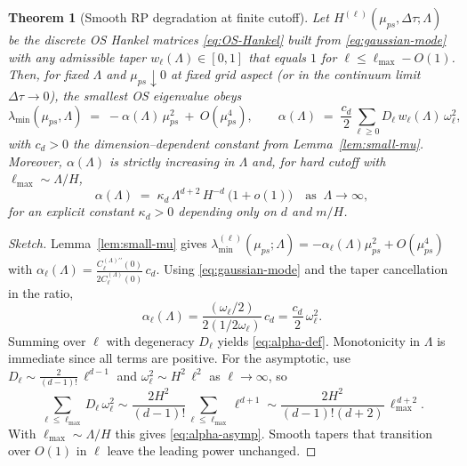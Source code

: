\documentclass[10pt]{article}
\theoremstyle{definition}
\theoremstyle{plain}
\newtheorem{theorem}{Theorem}[section]
\begin{document}
\begin{theorem}[Smooth RP degradation at finite cutoff]\label{thm:smooth-RP}
Let \(H^{(\ell)}(\mu_{ps},\Delta\tau;\Lambda)\) be the discrete OS Hankel matrices \eqref{eq:OS-Hankel} built from \eqref{eq:gaussian-mode} with any admissible taper \(w_\ell(\Lambda)\in[0,1]\) that equals \(1\) for \(\ell\le \ell_{\max}-O(1)\).
Then, for fixed \(\Lambda\) and \(\mu_{ps}\downarrow 0\) at fixed grid aspect (or in the continuum limit \(\Delta\tau\to0\)), the smallest OS eigenvalue obeys
\begin{equation}
  \lambda_{\min}(\mu_{ps},\Lambda)\;=\;-\alpha(\Lambda)\,\mu_{ps}^2\ +\ O(\mu_{ps}^4),
  \qquad
  \alpha(\Lambda)\;=\;\frac{c_d}{2}\sum_{\ell\ge0} D_\ell\,w_\ell(\Lambda)\,\omega_\ell^2,
  \label{eq:alpha-def}
\end{equation}
with \(c_d>0\) the dimension–dependent constant from Lemma~\ref{lem:small-mu}.
Moreover, \(\alpha(\Lambda)\) is strictly increasing in \(\Lambda\) and, for hard cutoff with \(\ell_{\max}\sim \Lambda/H\),
\begin{equation}
  \alpha(\Lambda)\;=\;\kappa_{d}\, \Lambda^{d+2}\,H^{-d}\ \big(1+o(1)\big)
  \quad\text{as }\ \Lambda\to\infty,
  \label{eq:alpha-asymp}
\end{equation}
for an explicit constant \(\kappa_{d}>0\) depending only on \(d\) and \(m/H\).
\end{theorem}

\begin{proof}[Sketch]
Lemma~\ref{lem:small-mu} gives
\(\lambda_{\min}^{(\ell)}(\mu_{ps};\Lambda)= -\alpha_\ell(\Lambda)\mu_{ps}^2+O(\mu_{ps}^4)\) with
\(\alpha_\ell(\Lambda)=\frac{C_\ell^{(\Lambda)\prime\prime}(0)}{2C_\ell^{(\Lambda)}(0)}\,c_d\).
Using \eqref{eq:gaussian-mode} and the taper cancellation in the ratio,
\[
\alpha_\ell(\Lambda)=\frac{(\omega_\ell/2)}{2(1/2\omega_\ell)}\,c_d
=\frac{c_d}{2}\,\omega_\ell^2.
\]
Summing over \(\ell\) with degeneracy \(D_\ell\) yields \eqref{eq:alpha-def}.
Monotonicity in \(\Lambda\) is immediate since all terms are positive.
For the asymptotic, use \(D_\ell\sim \frac{2}{(d-1)!}\,\ell^{d-1}\) and
\(\omega_\ell^2\sim H^2\,\ell^2\) as \(\ell\to\infty\), so
\[
\sum_{\ell\le \ell_{\max}} D_\ell\,\omega_\ell^2
\sim \frac{2H^2}{(d-1)!}\sum_{\ell\le \ell_{\max}}\ell^{d+1}
\sim \frac{2H^2}{(d-1)!(d+2)}\,\ell_{\max}^{\,d+2}.
\]
With \(\ell_{\max}\sim \Lambda/H\) this gives \eqref{eq:alpha-asymp}.
Smooth tapers that transition over \(O(1)\) in \(\ell\) leave the leading power unchanged.
\end{proof}
\end{document}
